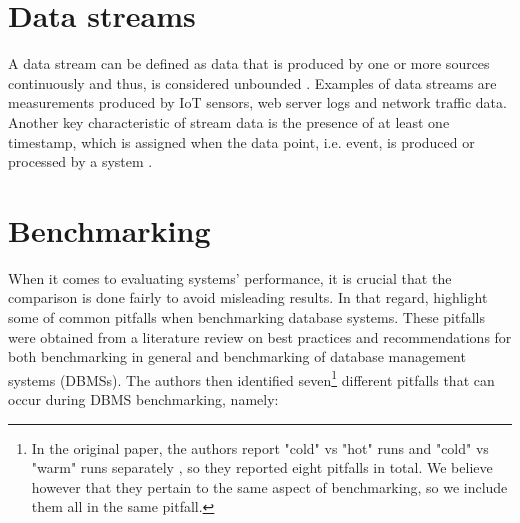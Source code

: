 


\section{Data streams}\label{sec:data-streams}
A data stream can be defined as data that is produced by one or more sources continuously and thus, is considered unbounded \cite{tylerakidauStreaming101World2015, fragkoulisSurveyEvolutionStream2024}. Examples of data streams are measurements produced by IoT sensors, web server logs and network traffic data. Another key characteristic of stream data is the presence of at least one timestamp, which is assigned when the data point, i.e. event, is produced or processed by a system \cite{fragkoulisSurveyEvolutionStream2024}.

\section{Benchmarking}\label{sec:benchmarking}
When it comes to evaluating systems' performance, it is crucial that the comparison is done fairly to avoid misleading results. In that regard, \citeauthor{raasveldtFairBenchmarkingConsidered2018} \cite{raasveldtFairBenchmarkingConsidered2018} highlight some of common pitfalls when benchmarking database systems. These pitfalls were obtained from a literature review on best practices and recommendations for both benchmarking in general and benchmarking of database management systems (DBMSs). The authors then identified seven\footnote{In the original paper, the authors report "cold" vs "hot" runs and "cold" vs "warm" runs separately \cite{raasveldtFairBenchmarkingConsidered2018} , so they reported eight pitfalls in total. We believe however that they pertain to the same aspect of benchmarking, so we include them all in the same pitfall.} different pitfalls that can occur during DBMS benchmarking, namely:

